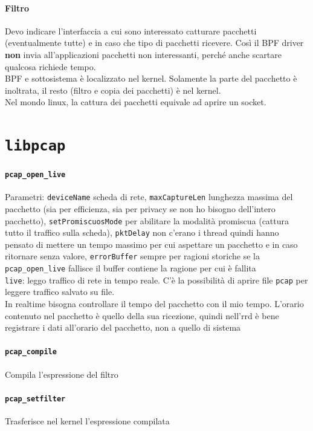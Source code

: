 \documentclass[10pt]{book}
\begin{document}
\paragraph{Filtro} Devo indicare l'interfaccia a cui sono interessato catturare pacchetti (eventualmente tutte) e in caso che tipo di pacchetti ricevere. Così il BPF driver \textbf{non} invia all'applicazioni pacchetti non interessanti, perché anche scartare qualcosa richiede tempo.\\
BPF e sottosistema è localizzato nel kernel. Solamente la parte del pacchetto è inoltrata, il resto (filtro e copia dei pacchetti) è nel kernel.\\
Nel mondo linux, la cattura dei pacchetti equivale ad aprire un socket.
\section{\texttt{libpcap}}
\paragraph{\texttt{pcap\_open\_live}} Parametri: \texttt{deviceName} scheda di rete, \texttt{maxCaptureLen} lunghezza massima del pacchetto (sia per efficienza, sia per privacy se non ho bisogno dell'intero pacchetto), \texttt{setPromiscuosMode} per abilitare la modalità promiscua (cattura tutto il traffico sulla scheda), \texttt{pktDelay} non c'erano i thread quindi hanno pensato di mettere un tempo massimo per cui aspettare un pacchetto e in caso ritornare senza valore, \texttt{errorBuffer} sempre per ragioni storiche se la \texttt{pcap\_open\_live} fallisce il buffer contiene la ragione per cui è fallita\\
\texttt{live}: leggo traffico di rete in tempo reale. C'è la possibilità di aprire file \texttt{pcap} per leggere traffico salvato su file.\\
In realtime bisogna controllare il tempo del pacchetto con il mio tempo. L'orario contenuto nel pacchetto è quello della sua ricezione, quindi nell'rrd è bene registrare i dati all'orario del pacchetto, non a quello di sistema
\paragraph{\texttt{pcap\_compile}} Compila l'espressione del filtro
\paragraph{\texttt{pcap\_setfilter}} Trasferisce nel kernel l'espressione compilata
\end{document}
